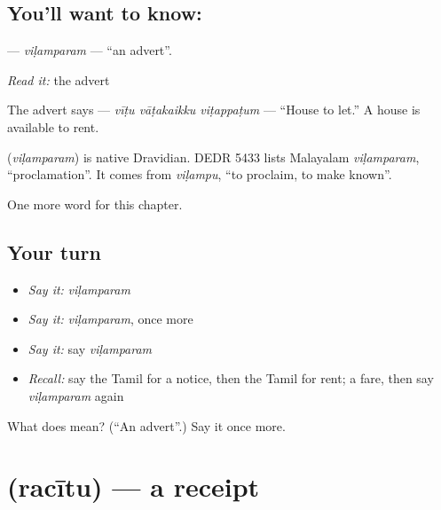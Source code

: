 \subsection*{You'll want to know: }
\textbf{} — \emph{viḷamparam} — \textquotedblleft{}an advert\textquotedblright{}.

\emph{Read it:} the advert

The advert says \textbf{  } — \emph{vīṭu vāṭakaikku viṭappaṭum} — \textquotedblleft{}House to let.\textquotedblright{} A house is available to rent.

\begin{cousinweb}
\textbf{} (\emph{viḷamparam}) is native Dravidian. DEDR 5433 lists Malayalam \emph{viḷamparam}, \textquotedblleft{}proclamation\textquotedblright{}. It comes from \emph{viḷampu}, \textquotedblleft{}to proclaim, to make known\textquotedblright{}.
\end{cousinweb}

\begin{grammarlens}[title={What you've built}]
One more word for this chapter.
\end{grammarlens}

\subsection*{Your turn}
\begin{itemize}
\raggedright
  \item \emph{Say it:} \emph{viḷamparam}
  \item \emph{Say it:} \emph{viḷamparam}, once more
  \item \emph{Say it:} say \emph{viḷamparam}
  \item \emph{Recall:} say the Tamil for a notice, then the Tamil for rent; a fare, then say \emph{viḷamparam} again
\end{itemize}

\begin{tcolorbox}[breakable,colback=teal!4,colframe=teal!35!black,title={Before you move on}]
What does  mean? (\textquotedblleft{}An advert\textquotedblright{}.) Say it once more.
\end{tcolorbox}
\section[\texorpdfstring{\ta{ரசீது} (racītu)}{ரசீது (racītu)}]{ (racītu) — a receipt}

